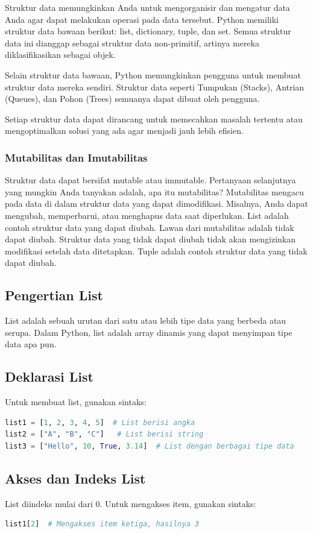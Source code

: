 \documentclass{article}
\begin{document}
Struktur data memungkinkan Anda untuk mengorganisir dan mengatur data Anda agar dapat melakukan operasi pada data tersebut. Python memiliki struktur data bawaan berikut: list, dictionary, tuple, dan set. Semua struktur data ini dianggap sebagai struktur data non-primitif, artinya mereka diklasifikasikan sebagai objek.

Selain struktur data bawaan, Python memungkinkan pengguna untuk membuat struktur data mereka sendiri. Struktur data seperti Tumpukan (Stacks), Antrian (Queues), dan Pohon (Trees) semuanya dapat dibuat oleh pengguna.

Setiap struktur data dapat dirancang untuk memecahkan masalah tertentu atau mengoptimalkan solusi yang ada agar menjadi jauh lebih efisien.

\subsubsection{Mutabilitas dan Imutabilitas}
Struktur data dapat bersifat mutable atau immutable. Pertanyaan selanjutnya yang mungkin Anda tanyakan adalah, apa itu mutabilitas? Mutabilitas mengacu pada data di dalam struktur data yang dapat dimodifikasi. Misalnya, Anda dapat mengubah, memperbarui, atau menghapus data saat diperlukan. List adalah contoh struktur data yang dapat diubah. Lawan dari mutabilitas adalah tidak dapat diubah. Struktur data yang tidak dapat diubah tidak akan mengizinkan modifikasi setelah data ditetapkan. Tuple adalah contoh struktur data yang tidak dapat diubah.

\subsection{Pengertian List}
List adalah sebuah urutan dari satu atau lebih tipe data yang berbeda atau serupa. Dalam Python, list adalah array dinamis yang dapat menyimpan tipe data apa pun.

\subsection{Deklarasi List}
Untuk membuat list, gunakan sintaks:
\begin{lstlisting}[language=Python, caption={}, captionpos=b]
list1 = [1, 2, 3, 4, 5]  # List berisi angka
list2 = ["A", "B", "C"]   # List berisi string
list3 = ["Hello", 10, True, 3.14]  # List dengan berbagai tipe data
\end{lstlisting}

\subsection{Akses dan Indeks List}
List diindeks mulai dari 0. Untuk mengakses item, gunakan sintaks:
\begin{lstlisting}[language=Python, caption={}, captionpos=b]
list1[2]  # Mengakses item ketiga, hasilnya 3
\end{lstlisting}
\end{document}
